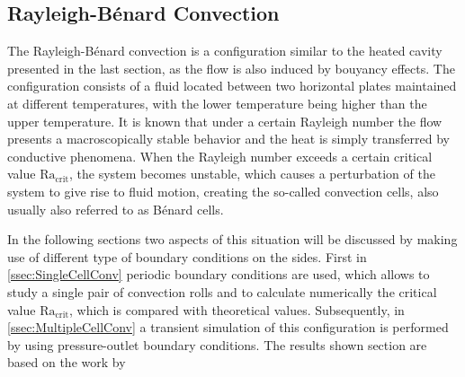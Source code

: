 \subsection{Rayleigh-Bénard Convection}\label{ssec:RayBer}

The Rayleigh-Bénard convection is a configuration similar to the heated cavity presented in the last section, as the flow is also induced by bouyancy effects. The configuration consists of a fluid located between two horizontal plates maintained at different temperatures, with the lower temperature being higher than the upper temperature. It is known that under a certain Rayleigh number the flow presents a macroscopically stable behavior and the heat is simply transferred by conductive phenomena. When the Rayleigh number exceeds a certain critical value $\text{Ra}_{\text{crit}}$, the system becomes unstable, which causes a perturbation of the system to give rise to fluid motion, creating the so-called convection cells, also usually also referred to as Bénard cells.

In the following sections two aspects of this situation will be discussed by making use of different type of boundary conditions on the sides. First in \cref{ssec:SingleCellConv} periodic boundary conditions are used, which allows  to study a single pair of convection rolls and to calculate numerically the critical value $\text{Ra}_{\text{crit}}$, which is compared with theoretical values. Subsequently, in \cref{ssec:MultipleCellConv} a transient simulation of this configuration is performed by using pressure-outlet boundary conditions. The results shown section are based on the work by \cite{miaoHighOrderSimulationLowMachFlows2022} %

